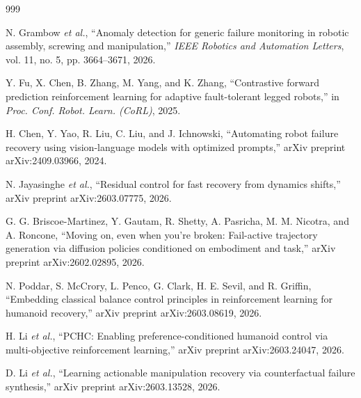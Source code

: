 \documentclass[12pt,a4paper,oneside]{report}
\begin{document}
\begin{thebibliography}{999}


N. Grambow \textit{et al.}, ``Anomaly detection for generic failure monitoring in robotic assembly, screwing and manipulation,'' \textit{IEEE Robotics and Automation Letters}, vol. 11, no. 5, pp. 3664--3671, 2026.




Y. Fu, X. Chen, B. Zhang, M. Yang, and K. Zhang, ``Contrastive forward prediction reinforcement learning for adaptive fault-tolerant legged robots,'' in \textit{Proc. Conf. Robot. Learn. (CoRL)}, 2025.




H. Chen, Y. Yao, R. Liu, C. Liu, and J. Ichnowski, ``Automating robot failure recovery using vision-language models with optimized prompts,'' arXiv preprint arXiv:2409.03966, 2024.




N. Jayasinghe \textit{et al.}, ``Residual control for fast recovery from dynamics shifts,'' arXiv preprint arXiv:2603.07775, 2026.




G. G. Briscoe-Martinez, Y. Gautam, R. Shetty, A. Pasricha, M. M. Nicotra, and A. Roncone, ``Moving on, even when you're broken: Fail-active trajectory generation via diffusion policies conditioned on embodiment and task,'' arXiv preprint arXiv:2602.02895, 2026.




N. Poddar, S. McCrory, L. Penco, G. Clark, H. E. Sevil, and R. Griffin, ``Embedding classical balance control principles in reinforcement learning for humanoid recovery,'' arXiv preprint arXiv:2603.08619, 2026.




H. Li \textit{et al.}, ``{PCHC}: Enabling preference-conditioned humanoid control via multi-objective reinforcement learning,'' arXiv preprint arXiv:2603.24047, 2026.




D. Li \textit{et al.}, ``Learning actionable manipulation recovery via counterfactual failure synthesis,'' arXiv preprint arXiv:2603.13528, 2026.




\end{thebibliography}
\end{document}
